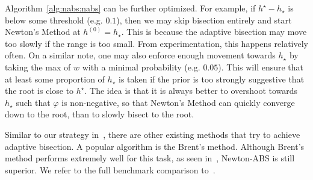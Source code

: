 Algorithm~\ref{alg:nabs:nabs} can be further optimized.
For example, if $h^\star - h_\star$ is below some threshold (e.g. $0.1$),
then we may skip bisection entirely and start Newton's Method at $h^{(0)} = h_\star$.
This is because the adaptive bisection may move too slowly if the range is too small.
From experimentation, this happens relatively often.
On a similar note, one may also enforce enough movement towards $h_\star$
by taking the max of $w$ with a minimal probability (e.g. $0.05$).
This will ensure that at least some proportion of $h_\star$ is taken 
if the prior is too strongly suggestive that the root is close to $h^\star$.
The idea is that it is always better to overshoot towards $h_\star$ such that $\varphi$ is non-negative,
so that Newton's Method can quickly converge down to the root,
than to slowly bisect to the root.

Similar to our strategy in~,
there are other existing methods that try to achieve adaptive bisection.
A popular algorithm is the Brent's method.
Although Brent's method performs extremely well for this task,
as seen in~,
Newton-ABS is still superior.
We refer to the full benchmark comparison to~.
